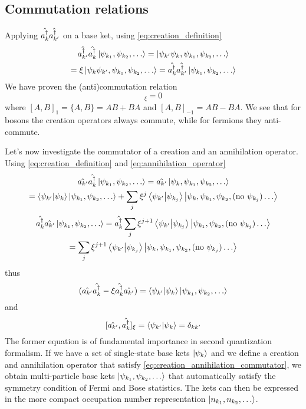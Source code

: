 \subsection{Commutation relations}
Applying $\hat{a_k^\dagger}\hat{a_{k'}^\dagger}$ on a base ket, using  \cref{eq:creation_definition}
\begin{multline}
    \hat{a_{k'}^\dagger}\hat{a_{k}^\dagger} \ket{\psi_{k_1}, \psi_{k_2}, \dots}
    = \ket{\psi_{k'}\psi_{k},\psi_{k_1}, \psi_{k_2}, \dots}
    \\= \xi \ket{\psi_{k}\psi_{k'},\psi_{k_1}, \psi_{k_2}, \dots}
    = \hat{a_k^\dagger}\hat{a_{k'}^\dagger}\ket{\psi_{k_1}, \psi_{k_2}, \dots}
\end{multline}
We have proven the (anti)commutation relation
\begin{equation}
    [\adjop{a_k}, \adjop{a_{k'}}]_\xi = 0
\end{equation}
where $[A,B]_1 = \{A,B\} = AB+BA$ and $[A,B]_{-1} = AB - BA$. We see that for bosons the creation operators always commute, while for fermions they anti-commute.

Let's now investigate the commutator of a creation and an annihilation operator. Using \cref{eq:creation_definition} and  \cref{eq:annihilation_operator}
\begin{multline}
    \hat{a_{k'}}\hat{a_{k}^\dagger} \ket{\psi_{k_1}, \psi_{k_2}, \dots}
    = \hat{a_{k'}} \ket{\psi_{k},\psi_{k_1}, \psi_{k_2}, \dots}
    \\= \braket{\psi_{k'}}{\psi_k} \ket{\psi_{k_1}, \psi_{k_2}, \dots}
    +    \sum_{j} \xi^{j} \braket{\psi_{k'}}{\psi_{k_j}} \ket{\psi_{k},\psi_{k_1}, \psi_{k_2}, (\text{no } \psi_{k_j}) \dots}
\end{multline}
\begin{multline}
    \hat{a_{k}^\dagger}\hat{a_{k'}} \ket{\psi_{k_1}, \psi_{k_2}, \dots}
    = \hat{a_{k}^\dagger} \sum_{j} \xi^{j+1} \braket{\psi_{k'}}{\psi_{k_j}} \ket{\psi_{k_1}, \psi_{k_2}, (\text{no } \psi_{k_j}) \dots}
    \\= \sum_{j} \xi^{j+1} \braket{\psi_{k'}}{\psi_{k_j}} \ket{\psi_{k},\psi_{k_1}, \psi_{k_2}, (\text{no } \psi_{k_j}) \dots}
\end{multline}
thus
\begin{equation}
    (\hat{a_{k'}}\hat{a_{k}^\dagger} -\xi  \hat{a_{k}^\dagger}\hat{a_{k'}}) = \braket{\psi_{k'}}{\psi_k} \ket{\psi_{k_1}, \psi_{k_2}, \dots}
\end{equation}
and
\begin{equation} \label{eq:creation_annihilation_commutator}
    [\hat{a_{k'}}, \hat{a_k^\dagger}]_\xi = \braket{\psi_{k'}}{\psi_k} = \delta_{kk'}
\end{equation}
The former equation is of fundamental importance in second quantization formalism. If we have a set of single-state base kets $\ket{\psi_k}$ and we define a creation and annihilation operator that satisfy \cref{eq:creation_annihilation_commutator}, we obtain multi-particle base kets $\ket{\psi_{k_1}, \psi_{k_2}, \dots}$ that automatically satisfy the symmetry condition of Fermi and Bose statistics. The kets can then be expressed in the more compact occupation number representation $\ket{n_{k_1}, n_{k_2}, \dots}$.

